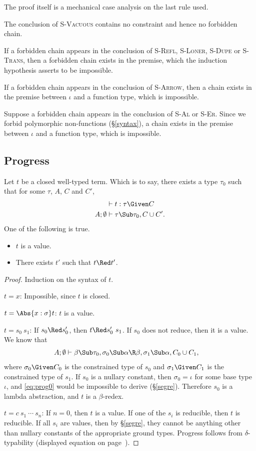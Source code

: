 \documentclass{amsart}
\theoremstyle{definition}
\begin{document}
The proof itself is a mechanical case analysis on the last rule
used.

The conclusion of \textsc{S-Vacuous} contains no constraint and
hence no forbidden chain.

If a forbidden chain appears in the conclusion of \textsc{S-Refl},
\textsc{S-Loner}, \textsc{S-Dupe} or \textsc{S-Trans}, then a
forbidden chain exists in the premise, which the induction
hypothesis asserts to be impossible.

If a forbidden chain appears
in the conclusion of \textsc{S-Arrow}, then a chain exists in the
premise between $\iota$ and a function type, which is impossible.

Suppose a forbidden chain appears in the conclusion of
\textsc{S-Al} or \textsc{S-Er}. Since we forbid polymorphic
non-functions (\S\ref{syntax}), a chain exists in the premise
between $\iota$ and a function type, which is impossible.

\subsection{Progress} Let $t$ be a closed well-typed term. Which
is to say, there exists a type $\tau_0$ such that for some
$\tau$, $A$, $C$ and $C'$,
\begin{align*}
&\vdash t:\tau\Given C\\
A;\emptyset&\vdash \tau\Sub\tau_0,C\cup C'.
\end{align*}
One of the following is true.
\begin{itemize}
\item $t$ is a value.
\item There exists $t'$ such that $t\Red t'$.
\end{itemize}

\begin{proof}
Induction on the syntax of $t$.

\Case$t=x$: Impossible, since $t$ is closed.

\Case$t=\Abs{x:\sigma}t$: $t$ is a value.

\Case$t=s_0~s_1$: If $s_0\Red s_0'$, then $t\Red s_0'~s_1$. If
$s_0$ does not reduce, then it is a value. We know that
\begin{align}
A;\emptyset&\vdash \beta\Sub\tau_0,
\sigma_0\Sub\alpha\R\beta,\sigma_1\Sub\alpha,C_0\cup C_1,
\label{eq:prog0}
\end{align}
where $\sigma_0\Given C_0$ is the constrained type of $s_0$ and
$\sigma_1\Given C_1$ is the constrained type of $s_1$. If $s_0$
is a nullary constant, then $\sigma_0=\iota$ for some base type
$\iota$, and \eqref{eq:prog0} would be impossible to derive
(\S\ref{segre}). Therefore $s_0$ is a lambda abstraction, and $t$
is a $\beta$-redex.

\Case$t=c~s_1~\cdots~s_n$: If $n=0$, then $t$ is a value. If one
of the $s_i$ is reducible, then $t$ is reducible. If all $s_i$
are values, then by \S\ref{segre}, they cannot be anything other
than nullary constants of the appropriate ground types. Progress
follows from $\delta$-typability (displayed equation on
page~\pageref{delta-typability}).
\end{proof}


\end{document}
